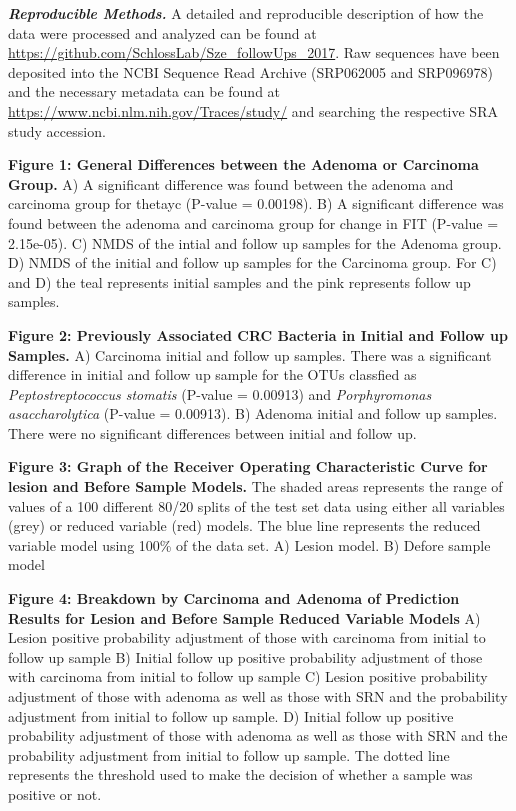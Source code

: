 \documentclass[12pt,]{article}
\begin{document}
\textbf{\emph{Reproducible Methods.}} A detailed and reproducible
description of how the data were processed and analyzed can be found at
\url{https://github.com/SchlossLab/Sze_followUps_2017}. Raw sequences
have been deposited into the NCBI Sequence Read Archive (SRP062005 and
SRP096978) and the necessary metadata can be found at
\url{https://www.ncbi.nlm.nih.gov/Traces/study/} and searching the
respective SRA study accession.

\newpage

\textbf{Figure 1: General Differences between the Adenoma or Carcinoma
Group.} A) A significant difference was found between the adenoma and
carcinoma group for thetayc (P-value = 0.00198). B) A significant
difference was found between the adenoma and carcinoma group for change
in FIT (P-value = 2.15e-05). C) NMDS of the intial and follow up samples
for the Adenoma group. D) NMDS of the initial and follow up samples for
the Carcinoma group. For C) and D) the teal represents initial samples
and the pink represents follow up samples.

\textbf{Figure 2: Previously Associated CRC Bacteria in Initial and
Follow up Samples.} A) Carcinoma initial and follow up samples. There
was a significant difference in initial and follow up sample for the
OTUs classfied as \emph{Peptostreptococcus stomatis} (P-value = 0.00913)
and \emph{Porphyromonas asaccharolytica} (P-value = 0.00913). B) Adenoma
initial and follow up samples. There were no significant differences
between initial and follow up.

\textbf{Figure 3: Graph of the Receiver Operating Characteristic Curve
for lesion and Before Sample Models.} The shaded areas represents the
range of values of a 100 different 80/20 splits of the test set data
using either all variables (grey) or reduced variable (red) models. The
blue line represents the reduced variable model using 100\% of the data
set. A) Lesion model. B) Defore sample model

\textbf{Figure 4: Breakdown by Carcinoma and Adenoma of Prediction
Results for Lesion and Before Sample Reduced Variable Models} A) Lesion
positive probability adjustment of those with carcinoma from initial to
follow up sample B) Initial follow up positive probability adjustment of
those with carcinoma from initial to follow up sample C) Lesion positive
probability adjustment of those with adenoma as well as those with SRN
and the probability adjustment from initial to follow up sample. D)
Initial follow up positive probability adjustment of those with adenoma
as well as those with SRN and the probability adjustment from initial to
follow up sample. The dotted line represents the threshold used to make
the decision of whether a sample was positive or not.
\end{document}
